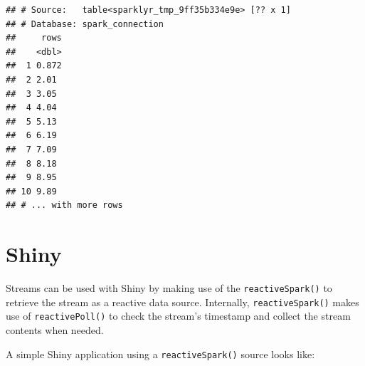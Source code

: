 \documentclass[]{book}
\newenvironment{Shaded}{\begin{snugshade}}{\end{snugshade}}
\newcommand{\ControlFlowTok}[1]{\textcolor[rgb]{0.13,0.29,0.53}{\textbf{#1}}}
\newcommand{\DataTypeTok}[1]{\textcolor[rgb]{0.13,0.29,0.53}{#1}}
\newcommand{\KeywordTok}[1]{\textcolor[rgb]{0.13,0.29,0.53}{\textbf{#1}}}
\newcommand{\NormalTok}[1]{#1}
\newcommand{\OperatorTok}[1]{\textcolor[rgb]{0.81,0.36,0.00}{\textbf{#1}}}
\newcommand{\StringTok}[1]{\textcolor[rgb]{0.31,0.60,0.02}{#1}}
\theoremstyle{definition}
\theoremstyle{definition}
\theoremstyle{definition}
\theoremstyle{remark}
\begin{document}
\begin{Shaded}
\end{Shaded}

\begin{verbatim}
## # Source:   table<sparklyr_tmp_9ff35b334e9e> [?? x 1]
## # Database: spark_connection
##     rows
##    <dbl>
##  1 0.872
##  2 2.01 
##  3 3.05 
##  4 4.04 
##  5 5.13 
##  6 6.19 
##  7 7.09 
##  8 8.18 
##  9 8.95 
## 10 9.89 
## # ... with more rows
\end{verbatim}

\hypertarget{shiny}{%
\section{Shiny}\label{shiny}}

Streams can be used with Shiny by making use of the
\texttt{reactiveSpark()} to retrieve the stream as a reactive data
source. Internally, \texttt{reactiveSpark()} makes use of
\texttt{reactivePoll()} to check the stream's timestamp and collect the
stream contents when needed.

A simple Shiny application using a \texttt{reactiveSpark()} source looks
like:
\end{document}

